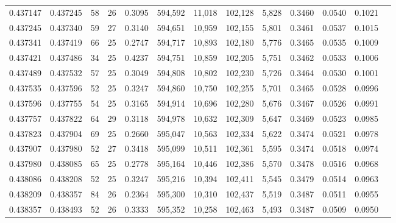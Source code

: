 \begin{tabular}{rrrrrrrrrrrrr}
0.437147 & 0.437245 &    58 &  26 &                                     0.3095 & 594,592 &  11,018 & 102,128 &   5,828 & 0.3460 & 0.0540 & 0.1021 \\
0.437245 & 0.437340 &    59 &  27 &                                     0.3140 & 594,651 &  10,959 & 102,155 &   5,801 & 0.3461 & 0.0537 & 0.1015 \\
0.437341 & 0.437419 &    66 &  25 &                                     0.2747 & 594,717 &  10,893 & 102,180 &   5,776 & 0.3465 & 0.0535 & 0.1009 \\
0.437421 & 0.437486 &    34 &  25 &                                     0.4237 & 594,751 &  10,859 & 102,205 &   5,751 & 0.3462 & 0.0533 & 0.1006 \\
0.437489 & 0.437532 &    57 &  25 &                                     0.3049 & 594,808 &  10,802 & 102,230 &   5,726 & 0.3464 & 0.0530 & 0.1001 \\
0.437535 & 0.437596 &    52 &  25 &                                     0.3247 & 594,860 &  10,750 & 102,255 &   5,701 & 0.3465 & 0.0528 & 0.0996 \\
0.437596 & 0.437755 &    54 &  25 &                                     0.3165 & 594,914 &  10,696 & 102,280 &   5,676 & 0.3467 & 0.0526 & 0.0991 \\
0.437757 & 0.437822 &    64 &  29 &                                     0.3118 & 594,978 &  10,632 & 102,309 &   5,647 & 0.3469 & 0.0523 & 0.0985 \\
0.437823 & 0.437904 &    69 &  25 &                                     0.2660 & 595,047 &  10,563 & 102,334 &   5,622 & 0.3474 & 0.0521 & 0.0978 \\
0.437907 & 0.437980 &    52 &  27 &                                     0.3418 & 595,099 &  10,511 & 102,361 &   5,595 & 0.3474 & 0.0518 & 0.0974 \\
0.437980 & 0.438085 &    65 &  25 &                                     0.2778 & 595,164 &  10,446 & 102,386 &   5,570 & 0.3478 & 0.0516 & 0.0968 \\
0.438086 & 0.438208 &    52 &  25 &                                     0.3247 & 595,216 &  10,394 & 102,411 &   5,545 & 0.3479 & 0.0514 & 0.0963 \\
0.438209 & 0.438357 &    84 &  26 &                                     0.2364 & 595,300 &  10,310 & 102,437 &   5,519 & 0.3487 & 0.0511 & 0.0955 \\
0.438357 & 0.438493 &    52 &  26 &                                     0.3333 & 595,352 &  10,258 & 102,463 &   5,493 & 0.3487 & 0.0509 & 0.0950 \\

\end{tabular}
